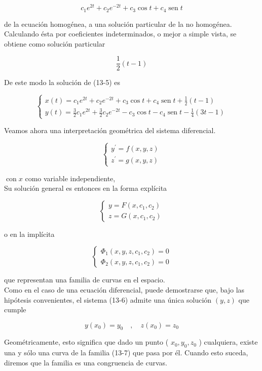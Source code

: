 \documentclass[10pt]{article}
\theoremstyle{plain}
\theoremstyle{definition}
\theoremstyle{remark}
\begin{document}
$$
c_{1} e^{2 t}+c_{2} e^{-2 t}+c_{3} \cos t+c_{4} \operatorname{sen} t
$$

de la ecuación homogénea, a una solución particular de la no homogénea. Calculando ésta por coeficientes indeterminados, o mejor a simple vista, se obtiene como solución particular

$$
\frac{1}{2}(t-1)
$$

De este modo la solución de (13-5) es

$$
\left\{\begin{array}{l}
x(t)=c_{1} e^{2 t}+c_{2} e^{-2 t}+c_{3} \cos t+c_{4} \operatorname{sen} t+\frac{1}{2}(t-1) \\
y(t)=\frac{3}{2} c_{1} e^{2 t}+\frac{3}{2} c_{2} e^{-2 t}-c_{3} \cos t-c_{4} \operatorname{sen} t-\frac{1}{4}(3 t-1)
\end{array}\right.
$$

Veamos ahora una interpretación geométrica del sistema diferencial.

$$
\left\{\begin{array}{l}
y^{\prime}=f(x, y, z) \\
z^{\prime}=g(x, y, z)
\end{array}\right.
$$

$\operatorname{con} x$ como variable independiente,\\
Su solución general es entonces en la forma explícita

$$
\left\{\begin{array}{l}
y=F\left(x, c_{1}, c_{2}\right) \\
z=G\left(x, c_{1}, c_{2}\right)
\end{array}\right.
$$

o en la implícita

\[
\left\{\begin{array}{l}
\Phi_{1}\left(x, y, z, c_{1}, c_{2}\right)=0  \tag{13-7}\\
\Phi_{2}\left(x, y, z, c_{1}, c_{2}\right)=0
\end{array}\right.
\]

que representan una familia de curvas en el espacio.\\
Como en el caso de una ecuación diferencial, puede demostrarse que, bajo las hipótesis convenientes, el sistema (13-6) admite una única solución $(y, z)$ que cumple

$$
y\left(x_{0}\right)=y_{0} \quad, \quad z\left(x_{0}\right)=z_{0}
$$

Geométricamente, esto significa que dado un punto ( $x_{0}, y_{0}, z_{0}$ ) cualquiera, existe una y sólo una curva de la familia (13-7) que pasa por él. Cuando esto suceda, diremos que la familia es una congruencia de curvas.
\end{document}
